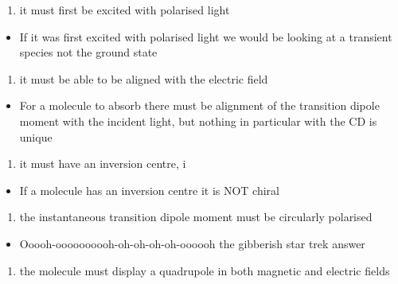\documentclass[
]{book}
\providecommand{\tightlist}{%
  \setlength{\itemsep}{0pt}\setlength{\parskip}{0pt}}
\begin{document}
\begin{enumerate}
\def\labelenumi{\alph{enumi}.}
\tightlist
\item
  it must first be excited with polarised light
\end{enumerate}

\begin{itemize}
\tightlist
\item
  If it was first excited with polarised light we would be looking at a transient species not the ground state
\end{itemize}

\begin{enumerate}
\def\labelenumi{\alph{enumi}.}
\setcounter{enumi}{1}
\tightlist
\item
  it must be able to be aligned with the electric field
\end{enumerate}

\begin{itemize}
\tightlist
\item
  For a molecule to absorb there must be alignment of the transition dipole moment with the incident light, but nothing in particular with the CD is unique
\end{itemize}

\begin{enumerate}
\def\labelenumi{\alph{enumi}.}
\setcounter{enumi}{2}
\tightlist
\item
  it must have an inversion centre, i
\end{enumerate}

\begin{itemize}
\tightlist
\item
  If a molecule has an inversion centre it is NOT chiral
\end{itemize}

\begin{enumerate}
\def\labelenumi{\alph{enumi}.}
\setcounter{enumi}{3}
\tightlist
\item
  the instantaneous transition dipole moment must be circularly polarised
\end{enumerate}

\begin{itemize}
\tightlist
\item
  Ooooh-oooooooooh-oh-oh-oh-oh-oooooh the gibberish star trek answer
\end{itemize}

\begin{enumerate}
\def\labelenumi{\alph{enumi}.}
\setcounter{enumi}{4}
\tightlist
\item
  the molecule must display a quadrupole in both magnetic and electric fields
\end{enumerate}
\end{document}
